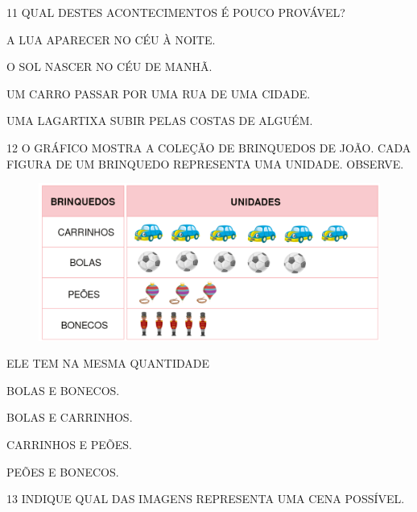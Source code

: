 \num{11} QUAL DESTES ACONTECIMENTOS É POUCO PROVÁVEL?

\begin{escolha}%
\item A LUA APARECER NO CÉU À NOITE.

\item O SOL NASCER NO CÉU DE MANHÃ.

\item UM CARRO PASSAR POR UMA RUA DE UMA CIDADE.

\item UMA LAGARTIXA SUBIR PELAS COSTAS DE ALGUÉM.
\end{escolha}

\num{12} O GRÁFICO MOSTRA A COLEÇÃO DE BRINQUEDOS DE JOÃO. CADA FIGURA DE UM
BRINQUEDO REPRESENTA UMA UNIDADE. OBSERVE.

\begin{figure}[H]
\includegraphics[width=\textwidth]{./media/SAEB_1ANO_MAT_FIGURA126.png}
\end{figure}

ELE TEM NA MESMA QUANTIDADE

\begin{escolha}%
\item BOLAS E BONECOS.

\item BOLAS E CARRINHOS.

\item CARRINHOS E PEÕES.

\item PEÕES E BONECOS.
\end{escolha}

\pagebreak

\num{13} INDIQUE QUAL DAS IMAGENS REPRESENTA UMA CENA POSSÍVEL.


